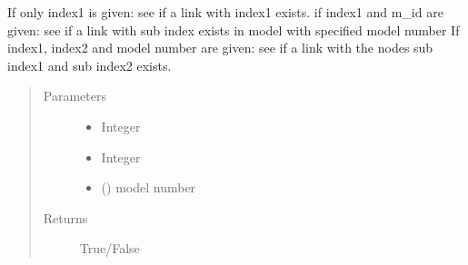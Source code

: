 \documentclass[letterpaper,10pt,english]{sphinxmanual}
\begin{document}
\begin{fulllineitems}
\begin{fulllineitems}
\label{\detokenize{api:beamon.database.database.Database.contains_link}}
If only index1 is given: see if a link with index1 exists.
if index1 and m\_id are given: see if a link with sub index exists in model with specified model number
If index1, index2 and model number are given: see if a link with the nodes sub index1 and sub index2 exists.
\begin{quote}\begin{description}
\item[{Parameters}] \leavevmode\begin{itemize}
\item {} 
 \textendash{} Integer

\item {} 
 \textendash{} Integer

\item {} 
 () \textendash{} model number

\end{itemize}

\item[{Returns}] \leavevmode
True/False

\end{description}\end{quote}

\end{fulllineitems}



\end{fulllineitems}
\end{document}
